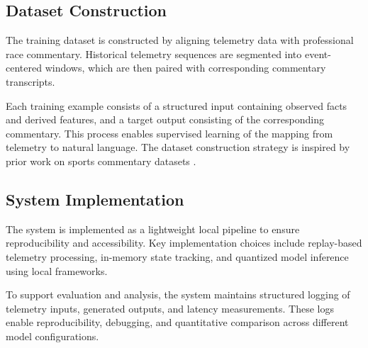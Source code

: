 \subsection{Dataset Construction}

The training dataset is constructed by aligning telemetry data with professional race commentary. Historical telemetry sequences are segmented into event-centered windows, which are then paired with corresponding commentary transcripts.

Each training example consists of a structured input containing observed facts and derived features, and a target output consisting of the corresponding commentary. This process enables supervised learning of the mapping from telemetry to natural language. The dataset construction strategy is inspired by prior work on sports commentary datasets \cite{AutoBaskData}.

\subsection{System Implementation}

The system is implemented as a lightweight local pipeline to ensure reproducibility and accessibility. Key implementation choices include replay-based telemetry processing, in-memory state tracking, and quantized model inference using local frameworks.

To support evaluation and analysis, the system maintains structured logging of telemetry inputs, generated outputs, and latency measurements. These logs enable reproducibility, debugging, and quantitative comparison across different model configurations.